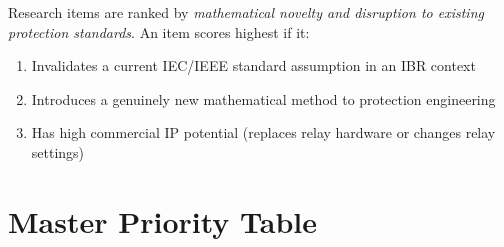 \documentclass[12pt, a4paper]{report}
\begin{document}
Research items are ranked by \textit{mathematical novelty and disruption to existing protection standards}. An item scores highest if it:
\begin{enumerate}[nosep]
  \item Invalidates a current IEC/IEEE standard assumption in an IBR context
  \item Introduces a genuinely new mathematical method to protection engineering
  \item Has high commercial IP potential (replaces relay hardware or changes relay settings)
\end{enumerate}

\section{Master Priority Table}
\end{document}
